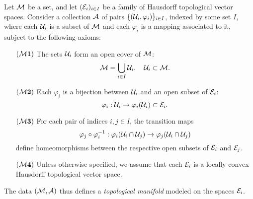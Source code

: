 \begin{definition}\label{D:topman}
Let $\mathcal{M}$ be a set, and let $(\mathcal{E}_i)_{i\in I}$ be a family of Hausdorff topological vector spaces. Consider a collection $\mathcal{A}$ of pairs $\{(\mathcal{U}_i, \varphi_i)\}_{i \in I}$, indexed by some set $I$, where each $\mathcal{U}_i$ is a subset of $\mathcal{M}$ and each $\varphi_i$ is a mapping associated to it, subject to the following axioms:

\begin{itemize}
    \item[$\mathbf{(\mathcal{M}1)}$] The sets $\mathcal{U}_i$ form an open cover of $\mathcal{M}$:
    \[
    \mathcal{M} = \bigcup_{i \in I} \mathcal{U}_i, \quad \mathcal{U}_i \subset \mathcal{M}.
    \]
    
    \item[$\mathbf{(\mathcal{M}2)}$] Each $\varphi_i$ is a bijection between $\mathcal{U}_i$ and an open subset of $\mathcal{E}_i$:
    \[
    \varphi_i: \mathcal{U}_i \to \varphi_i(\mathcal{U}_i) \subset \mathcal{E}_i.
    \]

    \item[$\mathbf{(\mathcal{M}3)}$] For each pair of indices $i, j \in I$, the transition maps
    \[
    \varphi_j \circ \varphi_i^{-1}: \varphi_i(\mathcal{U}_i \cap \mathcal{U}_j) \to \varphi_j(\mathcal{U}_i \cap \mathcal{U}_j)
    \]
    define homeomorphisms between the respective open subsets of $\mathcal{E}_i$ and $\mathcal{E}_j$.

    \item[$\mathbf{(\mathcal{M}4)}$] Unless otherwise specified, we assume that each $\mathcal{E}_i$ is a locally convex Hausdorff topological vector space.
\end{itemize}

The data $(\mathcal{M}, \mathcal{A})$ thus defines a \textit{topological manifold} modeled on the spaces $\mathcal{E}_i$.
\end{definition}






